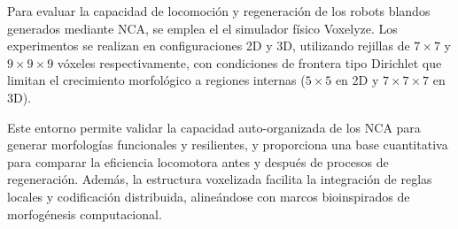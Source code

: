 Para evaluar la capacidad de locomoción y regeneración de los robots blandos generados mediante NCA, se emplea el el simulador físico Voxelyze. Los experimentos se realizan en configuraciones 2D y 3D, utilizando rejillas de $7 \times 7$ y $9 \times 9 \times 9$ vóxeles respectivamente, con condiciones de frontera tipo Dirichlet que limitan el crecimiento morfológico a regiones internas ($5 \times 5$ en 2D y $7 \times 7 \times 7$ en 3D).

Este entorno permite validar la capacidad auto-organizada de los NCA para generar morfologías funcionales y resilientes, y proporciona una base cuantitativa para comparar la eficiencia locomotora antes y después de procesos de regeneración. Además, la estructura voxelizada facilita la integración de reglas locales y codificación distribuida, alineándose con marcos bioinspirados de morfogénesis computacional.